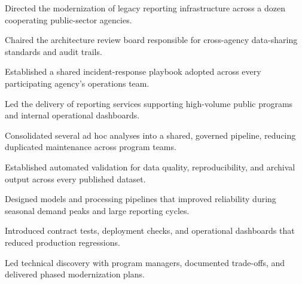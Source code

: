 \documentclass[fontsize=11pt, margin=normal, medium=print]{careerdossier-cv}
\begin{document}
\MakeCDossierHeader

\begin{CDossierEntry}[title = {Distinguished Engineer}, organization = {Continental Reliability Consortium}, location = {Ottawa, ON}, dates = {2024--Present}]
  \begin{CDossierItemize}
    \item Directed the modernization of legacy reporting infrastructure across a dozen cooperating public-sector agencies.
    \item Chaired the architecture review board responsible for cross-agency data-sharing standards and audit trails.
    \item Established a shared incident-response playbook adopted across every participating agency's operations team.
  \end{CDossierItemize}
\end{CDossierEntry}
\begin{CDossierEntry}[title = {Principal Engineer}, organization = {Northbridge Systems}, location = {Toronto, ON}, dates = {2022--2024}]
  \begin{CDossierItemize}
    \item Led the delivery of reporting services supporting high-volume public programs and internal operational dashboards.
    \item Consolidated several ad hoc analyses into a shared, governed pipeline, reducing duplicated maintenance across program teams.
    \item Established automated validation for data quality, reproducibility, and archival output across every published dataset.
  \end{CDossierItemize}
\end{CDossierEntry}
\begin{CDossierEntry}[title = {Senior Engineer}, organization = {Civic Technology Research Group}, location = {Toronto, ON}, dates = {2019--2022}]
  \begin{CDossierItemize}
    \item Designed models and processing pipelines that improved reliability during seasonal demand peaks and large reporting cycles.
    \item Introduced contract tests, deployment checks, and operational dashboards that reduced production regressions.
    \item Led technical discovery with program managers, documented trade-offs, and delivered phased modernization plans.
  \end{CDossierItemize}
\end{CDossierEntry}
\end{document}
